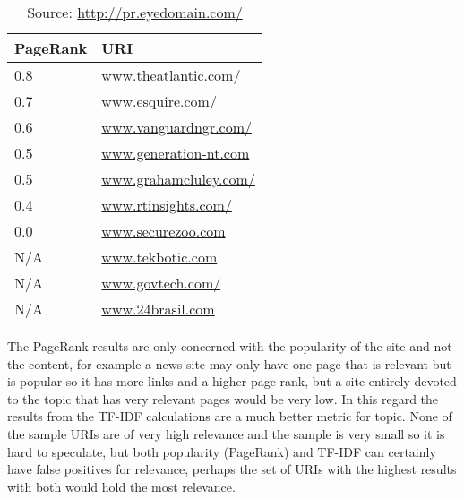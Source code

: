 \documentclass[12pt, a4paper]{article}
\begin{document}
\begin{table}[H]
\centering
\begin{tabularx}{0.55\textwidth}{ll}
  \hline
  PageRank & URI \\ 
  \hline
  0.8 & \url{www.theatlantic.com/} \\ 
  0.7 & \url{www.esquire.com/} \\ 
  0.6 & \url{www.vanguardngr.com/} \\ 
  0.5 & \url{www.generation-nt.com} \\ 
  0.5 & \url{www.grahamcluley.com/} \\ 
  0.4 & \url{www.rtinsights.com/} \\ 
  0.0 & \url{www.securezoo.com} \\ 
  N/A & \url{www.tekbotic.com} \\ 
  N/A & \url{www.govtech.com/} \\ 
  N/A & \url{www.24brasil.com} \\ 
  \hline
\end{tabularx}
\caption{Source: \url{http://pr.eyedomain.com/}}
\end{table}

The PageRank results are only concerned with the popularity of the site and not
the content, for example a news site may only have one page that is
relevant but is popular so it has more links and a higher page rank,
but a site entirely devoted to the topic that has very relevant pages
would be very low. In this regard the results from the TF-IDF
calculations are a much better metric for topic.
None of the sample URIs are of very high relevance and the sample
is very small so it is hard to speculate, but both popularity
(PageRank) and TF-IDF can certainly have false positives for
relevance, perhaps the set of URIs with the highest results
with both would hold the most relevance.
\end{document}
